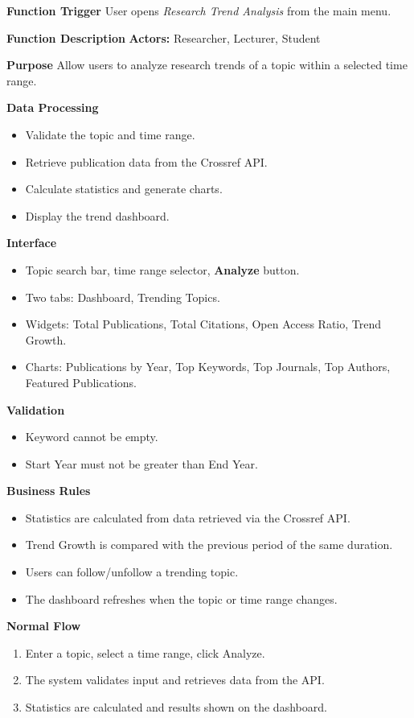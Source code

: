 \documentclass[12pt,a4paper]{article}
\begin{document}
{{\textbf{Function Trigger}
User opens \textit{Research Trend Analysis} from the main menu.
\medskip

\textbf{Function Description}
\textbf{Actors:} Researcher, Lecturer, Student
\medskip

\textbf{Purpose}
Allow users to analyze research trends of a topic within a selected time range.
\medskip

\textbf{Data Processing}
\begin{itemize}[label=-]
	\item Validate the topic and time range.
	\item Retrieve publication data from the Crossref API.
	\item Calculate statistics and generate charts.
	\item Display the trend dashboard.
\end{itemize}
\medskip

\textbf{Interface}
\begin{itemize}[label=-]
	\item Topic search bar, time range selector, \textbf{Analyze} button.
	\item Two tabs: Dashboard, Trending Topics.
	\item Widgets: Total Publications, Total Citations, Open Access Ratio, Trend Growth.
	\item Charts: Publications by Year, Top Keywords, Top Journals, Top Authors, Featured Publications.
\end{itemize}
\medskip

\textbf{Validation}
\begin{itemize}[label=-]
	\item Keyword cannot be empty.
	\item Start Year must not be greater than End Year.
\end{itemize}
\medskip

\textbf{Business Rules}
\begin{itemize}[label=-]
	\item Statistics are calculated from data retrieved via the Crossref API.
	\item Trend Growth is compared with the previous period of the same duration.
	\item Users can follow/unfollow a trending topic.
	\item The dashboard refreshes when the topic or time range changes.
\end{itemize}
\medskip

\textbf{Normal Flow}
\begin{enumerate}
	\item Enter a topic, select a time range, click Analyze.
	\item The system validates input and retrieves data from the API.
	\item Statistics are calculated and results shown on the dashboard.
\end{enumerate}
\medskip

}}
\end{document}
